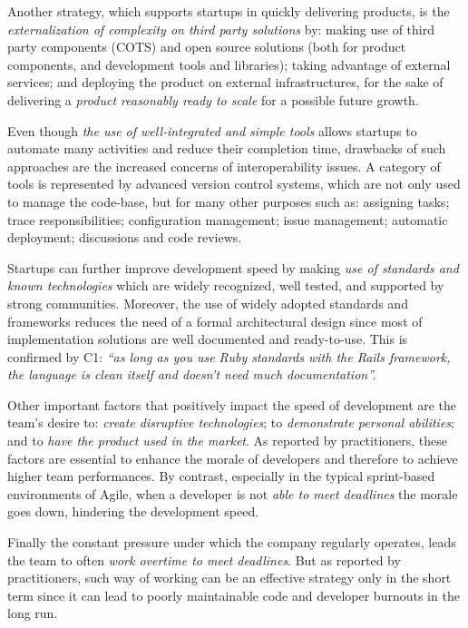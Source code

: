 \documentclass[10pt,journal,letterpaper,compsoc]{IEEEtran}
\begin{document}
Another strategy, which supports startups in quickly delivering products, is
the \textit{externalization of complexity on third party solutions} by: making
use of third party components (COTS) and open source solutions (both for
product components, and development tools and libraries); taking advantage of
external services; and deploying the product on external infrastructures, for
the sake of delivering a \textit{product reasonably ready to scale} for a
possible future growth.

Even though \textit{the use of well-integrated and simple tools} allows
startups to automate many activities and reduce their completion time, drawbacks
of such approaches are the increased concerns of interoperability issues. A
category of tools is represented by advanced version control systems, which are
not only used to manage the code-base, but for many other purposes such as:
assigning tasks; trace responsibilities; configuration management; issue
management; automatic deployment; discussions and code reviews.

Startups can further improve development speed by making \textit{use of
standards and known technologies} which are widely recognized, well tested, and
supported by strong communities. Moreover, the use of widely adopted standards
and frameworks reduces the need of a formal architectural design since most of
implementation solutions are well documented and ready-to-use. This is confirmed
by C1: \textit{``as long as you use Ruby standards with the Rails framework, the
language is clean itself and doesn't need much documentation''.}

Other important factors that positively impact the speed of development are the
team's desire to: \textit{create disruptive technologies}; to
\textit{demonstrate personal abilities}; and to \textit{have the product used in
the market}. As reported by practitioners, these factors are essential to
enhance the morale of developers and therefore to achieve higher team
performances. By contrast, especially in the typical sprint-based environments
of Agile, when a developer is not \textit{able to meet deadlines} the morale
goes down, hindering the development speed.

Finally the constant pressure under which the company regularly operates, leads
the team to often \textit{work overtime to meet deadlines}. But as reported by
practitioners, such way of working can be an effective strategy only in the
short term since it can lead to poorly maintainable code and developer burnouts
in the long run.
\end{document}

